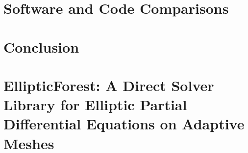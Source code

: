 \documentclass[12pt,twoside]{report}
\begin{document}
\chapter{Software and Code Comparisons}
\label{chap:software-and-code}





\chapter{Conclusion}
\label{chap:conclusion}

{}


{}
\appendix
\chapter{EllipticForest: A Direct Solver Library for Elliptic Partial Differential Equations on Adaptive Meshes}
\label{apdx:elliptic-forest}

% 
% 
% 
% 
\end{document}
